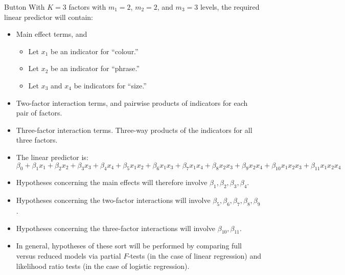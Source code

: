 \begin{Example}{Button}{}
      With $ K=3 $ factors with $ m_1=2 $, $ m_2=2 $, and $ m_3=3 $ levels, the required linear predictor will contain:
      \begin{itemize}
            \item Main effect terms, and
                  \begin{itemize}
                        \item Let $ x_1 $ be an indicator for ``colour.''
                        \item Let $ x_2 $ be an indicator for ``phrase.''
                        \item Let $ x_3 $ and $ x_4 $ be indicators for ``size.''
                  \end{itemize}
            \item Two-factor interaction terms, and pairwise products of indicators for each pair of factors.
            \item Three-factor interaction terms. Three-way products of the indicators for all three factors.
            \item The linear predictor is:
                  \[ \beta_0+\beta_1x_1+\beta_2x_2+\beta_3x_3+\beta_4x_4+\beta_5x_1x_2+\beta_6x_1x_3+\beta_7x_1x_4+\beta_8x_2x_3+\beta_9x_2x_4+\beta_{10}x_1x_2x_3+\beta_{11}x_1x_2x_4 \]
            \item Hypotheses concerning the main effects will therefore involve $ \beta_1,\beta_2,\beta_3,\beta_4 $.
            \item Hypotheses concerning the two-factor interactions will involve $ \beta_5,\beta_6,\beta_7,\beta_8,\beta_9 $.
            \item Hypotheses concerning the three-factor interactions will involve $ \beta_{10},\beta_{11} $.
      \end{itemize}
\end{Example}
\begin{itemize}
      \item In general, hypotheses of these sort will be performed by comparing full versus reduced models via
            partial $F$-tests (in the case of linear regression) and likelihood ratio tests (in the case of logistic
            regression).
\end{itemize}
